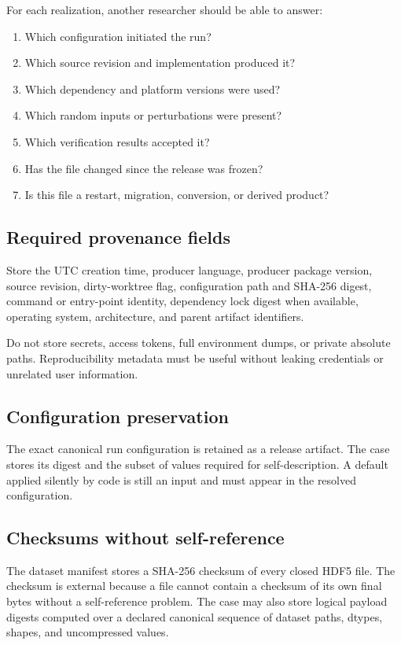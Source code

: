 \documentclass[11pt]{article}
\begin{document}
For each realization, another researcher should be able to answer:
\begin{enumerate}[label=\arabic*.]
  \item Which configuration initiated the run?
  \item Which source revision and implementation produced it?
  \item Which dependency and platform versions were used?
  \item Which random inputs or perturbations were present?
  \item Which verification results accepted it?
  \item Has the file changed since the release was frozen?
  \item Is this file a restart, migration, conversion, or derived product?
\end{enumerate}

\subsection{Required provenance fields}

Store the UTC creation time, producer language, producer package version, source revision, dirty-worktree flag, configuration path and SHA-256 digest, command or entry-point identity, dependency lock digest when available, operating system, architecture, and parent artifact identifiers.

Do not store secrets, access tokens, full environment dumps, or private absolute paths. Reproducibility metadata must be useful without leaking credentials or unrelated user information.

\subsection{Configuration preservation}

The exact canonical run configuration is retained as a release artifact. The case stores its digest and the subset of values required for self-description. A default applied silently by code is still an input and must appear in the resolved configuration.

\subsection{Checksums without self-reference}

The dataset manifest stores a SHA-256 checksum of every closed HDF5 file. The checksum is external because a file cannot contain a checksum of its own final bytes without a self-reference problem. The case may also store logical payload digests computed over a declared canonical sequence of dataset paths, dtypes, shapes, and uncompressed values.
\end{document}
